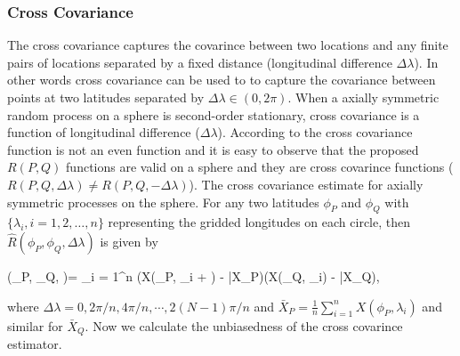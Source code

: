 	\subsubsection{Cross Covariance}
		
	The cross covariance captures the covarince between two locations and any finite pairs of locations separated by a fixed distance (longitudinal difference $\Delta\lambda$). In other words cross covariance can be used to to capture the covariance between points at two latitudes separated by $\Delta \lambda \in (0,2\pi)$. When a axially symmetric random process on a sphere is second-order stationary, cross covariance is a function of longitudinal difference ($\Delta\lambda$). According to \cite{Wackernagel2013} the cross covariance function is not an even function and it is easy to observe that the proposed $R(P,Q)$ functions are valid on a sphere and they are cross covarince functions ($R(P,Q, \Delta\lambda) \ne R(P,Q,-\Delta\lambda)$). 
	The cross covariance estimate for axially symmetric processes on the sphere. For any two latitudes $\phi_P$ and $\phi_Q$ with $\{\lambda_i, i = 1, 2, \ldots, n\}$ representing the gridded longitudes on each circle, then $\hat{R}(\phi_P, \phi_Q, \Delta \lambda)$ is given by
		
	
		
	\beq
	(\phi_P, \phi_Q, \Delta \lambda)= \sum_{i = 1}^n (X(\phi_P, \lambda_i + \Delta \lambda) - \bar{X}_P)(X(\phi_Q, \lambda_i) - \bar{X}_Q), 
	\eeq
	
	where $\Delta \lambda = 0, 2\pi/n, 4\pi/n, \cdots, 2(N-1)\pi/n$ and $\bar{X}_P = \frac{1}{n}\sum_{i=1}^n X(\phi_P, \lambda_i)$ and similar for $\bar{X}_Q$. Now we calculate the unbiasedness of the cross covarince estimator. 
	

